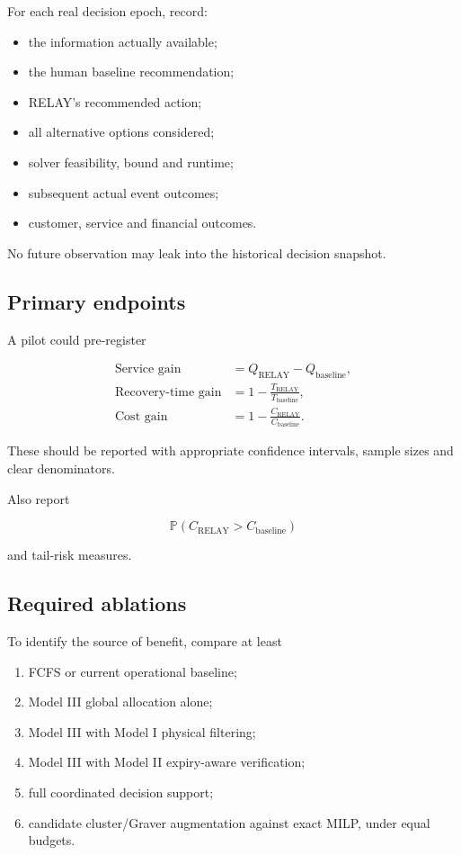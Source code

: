 \documentclass[10pt,a4paper]{article}
\newcommand{\PP}{\mathbb{P}}
\theoremstyle{plain}
\theoremstyle{definition}
\theoremstyle{remark}
\begin{document}
For each real decision epoch, record:

\begin{itemize}[leftmargin=18pt,itemsep=2pt]
\item the information actually available;
\item the human baseline recommendation;
\item RELAY's recommended action;
\item all alternative options considered;
\item solver feasibility, bound and runtime;
\item subsequent actual event outcomes;
\item customer, service and financial outcomes.
\end{itemize}

No future observation may leak
into the historical decision snapshot.

\subsection{Primary endpoints}

A pilot could pre-register

\begin{align}
\text{Service gain}
&=
Q_{\mathrm{RELAY}}-Q_{\mathrm{baseline}},
\\
\text{Recovery-time gain}
&=
1-
\frac{
T_{\mathrm{RELAY}}
}{
T_{\mathrm{baseline}}
},
\\
\text{Cost gain}
&=
1-
\frac{
C_{\mathrm{RELAY}}
}{
C_{\mathrm{baseline}}
}.
\end{align}

These should be reported with
appropriate confidence intervals,
sample sizes and clear denominators.

Also report

\[
\PP(
C_{\mathrm{RELAY}}>
C_{\mathrm{baseline}}
)
\]

and tail-risk measures.

\subsection{Required ablations}

To identify the source of benefit,
compare at least

\begin{enumerate}[
  label=(\Alph*),
  leftmargin=20pt,
  itemsep=2pt
]
\item FCFS or current operational baseline;
\item Model III global allocation alone;
\item Model III with Model I physical filtering;
\item Model III with Model II
expiry-aware verification;
\item full coordinated decision support;
\item candidate cluster/Graver augmentation
against exact MILP, under equal budgets.
\end{enumerate}
\end{document}
